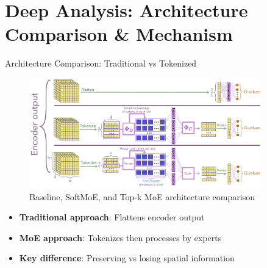 \documentclass{beamer}
\begin{document}
\section{Deep Analysis: Architecture Comparison \& Mechanism}

\begin{frame}{Architecture Comparison: Traditional vs Tokenized}
  \begin{figure}
    \centering
    \includegraphics[width=0.9\textwidth]{Don_t_flatten_tokenize/figures/architectures.pdf}
    \caption{Baseline, SoftMoE, and Top-k MoE architecture comparison}
  \end{figure}
  
  \begin{itemize}
    \item \textbf{Traditional approach}: Flattens encoder output
    \item \textbf{MoE approach}: Tokenizes then processes by experts
    \item \textbf{Key difference}: Preserving vs losing spatial information
  \end{itemize}
\end{frame}
\end{document}

